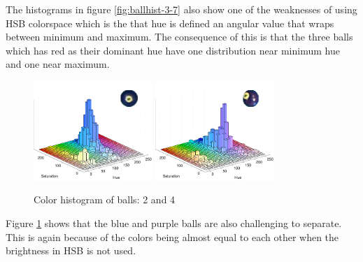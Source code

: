 The histograms in figure \ref{fig:ballhist-3-7} also show one of the weaknesses of using HSB colorspace which is the that hue is defined an angular value that wraps between minimum and maximum. The consequence of this is that the three  balls which has red as their dominant hue have one distribution near minimum hue and one near maximum.
\begin{figure}[H]
\centering
\subfloat
{
	\includegraphics[width=0.4\textwidth]{images/ballhist/2}
}
\subfloat
{
	\includegraphics[width=0.4\textwidth]{images/ballhist/4}
}
\caption{Color histogram of balls: 2 and 4}
\label{fig:ballhist-2-4}
\end{figure}
Figure \ref{fig:ballhist-2-4} shows that the blue and purple balls are also challenging to separate. This is again because of the colors being almost equal to each other when the brightness in HSB is not used.

